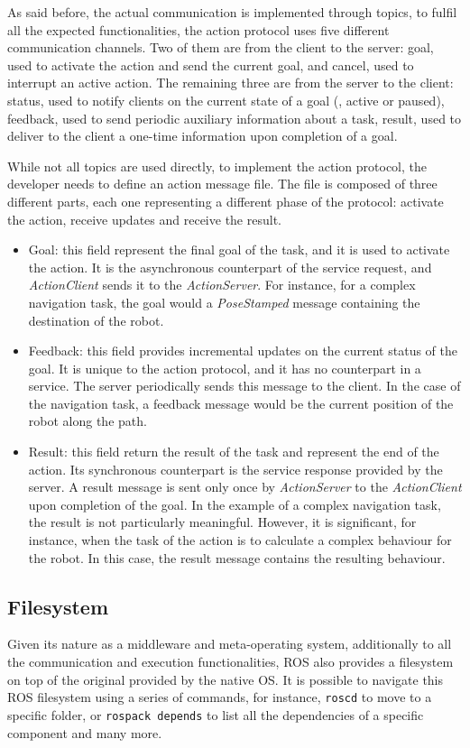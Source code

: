 As said before, the actual communication is implemented through topics, to fulfil all the expected functionalities, the action protocol uses five different communication channels. Two of them are from the client to the server: goal, used to activate the action and send the current goal, and cancel, used to interrupt an active action. The remaining three are from the server to the client: status, used to notify clients on the current state of a goal (\eg, active or paused), feedback, used to send periodic auxiliary information about a task, result, used to deliver to the client a one-time information upon completion of a goal.

While not all topics are used directly, to implement the action protocol, the developer needs to define an action message file. The file is composed of three different parts, each one representing a different phase of the protocol: activate the action, receive updates and receive the result. 
\begin{itemize}
\item Goal: this field represent the final goal of the task, and it is used to activate the action. It is the asynchronous counterpart of the service request, and \textit{ActionClient} sends it to the \textit{ActionServer}. For instance, for a complex navigation task, the goal would a \textit{PoseStamped} message containing the destination of the robot.
\item Feedback: this field provides incremental updates on the current status of the goal. It is unique to the action protocol, and it has no counterpart in a service. The server periodically sends this message to the client. In the case of the navigation task, a feedback message would be the current position of the robot along the path.
\item Result: this field return the result of the task and represent the end of the action. Its synchronous counterpart is the service response provided by the server. A result message is sent only once by \textit{ActionServer} to the \textit{ActionClient} upon completion of the goal. In the example of a complex navigation task, the result is not particularly meaningful. However, it is significant, for instance, when the task of the action is to calculate a complex behaviour for the robot. In this case, the result message contains the resulting behaviour.
\end{itemize}

\subsection{Filesystem}
Given its nature as a middleware and meta-operating system, additionally to all the communication and execution functionalities, ROS also provides a filesystem on top of the original provided by the native OS. It is possible to navigate this ROS filesystem using a series of commands, for instance, \texttt{roscd} to move to a specific folder, or \texttt{rospack depends} to list all the dependencies of a specific component and many more.

